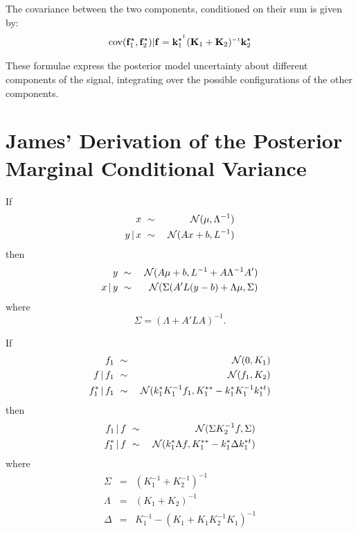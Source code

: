 \documentclass[twoside]{article}
\begin{document}
The covariance between the two components, conditioned on their sum is given by:
\begin{align}
\cov(\vf_1^\star, \vf_2^\star) | \vf = \vk_1^{\star\tra} (\vK_1 + \vK_2)\inv \vk_2^\star
\end{align}

These formulae express the posterior model uncertainty about different components of the signal, integrating over the possible configurations of the other components.





\section{James' Derivation of the Posterior Marginal Conditional Variance}
\begin{lem}
\label{lem:cond}
If
\begin{eqnarray}
x & \ \sim\  & \mathcal{N}(\mu, \Lambda^{-1}) \\
y \,|\, x & \ \sim\  & \mathcal{N}(Ax + b, L^{-1})
\end{eqnarray}
then
\begin{eqnarray}
y & \ \sim\  & \mathcal{N}(A\mu + b, L^{-1} + A\Lambda^{-1}A') \\
x \,|\, y & \ \sim\  & \mathcal{N}(\Sigma(A'L(y-b) + \Lambda\mu, \Sigma)
\end{eqnarray}
where
\begin{equation}
\Sigma = (\Lambda + A'LA)^{-1}.
\end{equation}
\end{lem}
\begin{prop}
If
\begin{eqnarray}
f_1 & \ \sim\  & \mathcal{N}(0, K_1) \\
f \,|\, f_1 & \ \sim\  & \mathcal{N}(f_1, K_2) \\
f_1^* \,|\, f_1 & \ \sim\  & \mathcal{N}(k_1^*K_1^{-1}f_1, K_1^{**} - k_1^*K_1^{-1}k_1^{*t})
\end{eqnarray}
then
\begin{eqnarray}
f_1 \,|\, f & \ \sim\  & \mathcal{N}(\Sigma K_2^{-1}f, \Sigma) \\
f_1^* \,|\, f & \ \sim\  & \mathcal{N}(k_1^*\Lambda f, K_1^{**} - k_1^*\Delta k_1^{*t})
\end{eqnarray}
where
\begin{eqnarray}
\Sigma & = & (K_1^{-1} + K_2^{-1})^{-1} \\
\Lambda & = & (K_1 + K_2)^{-1} \\
\Delta & = & K_1^{-1} - (K_1 + K_1K_2^{-1}K_1)^{-1}
\end{eqnarray}
\end{prop}
\end{document}
